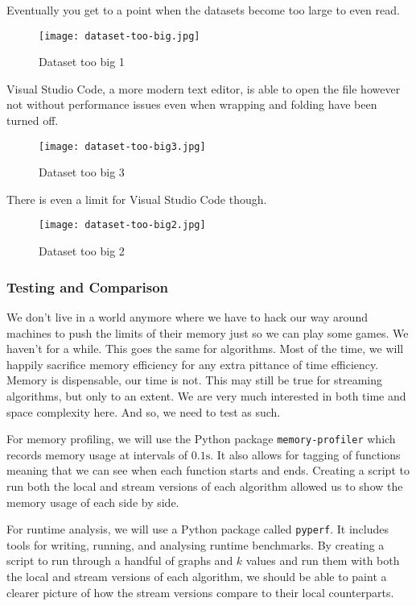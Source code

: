 Eventually you get to a point when the datasets become too large to even read.

\begin{figure}[htb]
    \centering
    \texttt{[image: dataset-too-big.jpg]}
    \caption{Dataset too big 1}
\end{figure}

Visual Studio Code, a more modern text editor, is able to open the file however
not without performance issues even when wrapping and folding have been turned
off.

\begin{figure}[htb]
    \centering
    \texttt{[image: dataset-too-big3.jpg]}
    \caption{Dataset too big 3}
\end{figure}

There is even a limit for Visual Studio Code though.

\begin{figure}[htb]
    \centering
    \texttt{[image: dataset-too-big2.jpg]}
    \caption{Dataset too big 2}
\end{figure}

\subsubsection{Testing and Comparison}

We don't live in a world anymore where we have to hack our way around machines
to push the limits of their memory just so we can play some games. We haven't
for a while. This goes the same for algorithms. Most of the time, we will
happily sacrifice memory efficiency for any extra pittance of time efficiency.
Memory is dispensable, our time is not. This may still be true for streaming
algorithms, but only to an extent. We are very much interested in both time and
space complexity here. And so, we need to test as such.

For memory profiling, we will use the Python package \texttt{memory-profiler}
which records memory usage at intervals of \(0.1\text{s}\). It also allows for
tagging of functions meaning that we can see when each function starts and
ends. Creating a script to run both the local and stream versions of each
algorithm allowed us to show the memory usage of each side by side.

For runtime analysis, we will use a Python package called \texttt{pyperf}. It
includes tools for writing, running, and analysing runtime benchmarks. By
creating a script to run through a handful of graphs and \(k\) values and run
them with both the local and stream versions of each algorithm, we should be
able to paint a clearer picture of how the stream versions compare to their
local counterparts.

